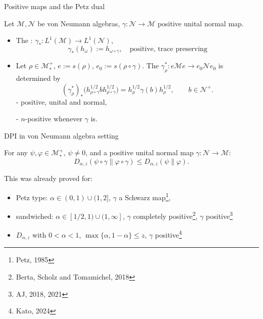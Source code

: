 \documentclass[mathserif]{beamer}
\newcommand{\<}{\langle}
\renewcommand{\>}{\rangle}
\newcommand{\Me}{\mathcal M}
\newcommand{\Ne}{\mathcal N}
\begin{document}
\begin{frame}{Positive maps and the Petz dual}


Let $\Me,\Ne$ be von Neumann algebras, $\gamma:\Ne \to \Me$ positive unital normal map.

\medskip
\begin{itemize}
\item The : $\gamma_*: L^1(\Me)\to L^1(\Ne)$,
\[
 \gamma_*(h_\omega):=h_{\omega\circ\gamma},\quad \text{positive, trace
preserving}
\]
\item Let $\rho\in \Me_*^+$, $e:=s(\rho)$, $e_0:= s(\rho\circ \gamma)$.
The  $\gamma^*_\rho:e\Me e\to e_0\Ne e_0$ is determined by
\[
(\gamma^*_\rho)_*\bigl(h_{\rho\circ\gamma}^{1/2}bh_{\rho\circ\gamma}^{1/2}\bigr)
=h_\rho^{1/2}\gamma(b)h_\rho^{1/2},\qquad b\in\Ne^+.
\]
 - positive, unital and normal,

 - $n$-positive whenever $\gamma$ is.


\end{itemize}


\end{frame}

\begin{frame}{DPI in von Neumann algebra setting}

For any $\psi,\varphi\in \Me_*^+$, $\psi\ne 0$, and a positive unital normal map
$\gamma:\Ne\to \Me$:
\[
D_{\alpha,z}(\psi\circ\gamma\|\varphi\circ\gamma)\le D_{\alpha,z}(\psi\|\varphi).
\]

This was already proved for:

\medskip

\begin{itemize}
\item Petz type: $\alpha\in (0,1)\cup(1,2]$, $\gamma$ a Schwarz map\footnote{Petz, 1985},
\item sandwiched: $\alpha\in [1/2,1)\cup (1,\infty]$, $\gamma$ completely
positive\footnote{Berta, Scholz and Tomamichel, 2018}, $\gamma$ positive\footnote{AJ,
2018, 2021}
\item $D_{\alpha,z}$ with $0<\alpha<1$, $\max\{\alpha,1-\alpha\}\le z$, $\gamma$
positive\footnote{Kato, 2024}
\end{itemize}



\end{frame}
\end{document}
